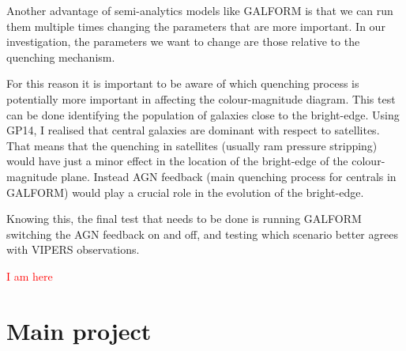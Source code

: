 \documentclass[11pt]{article}
\begin{document}
Another advantage of semi-analytics models like GALFORM is that we can run them multiple times changing the parameters that are more important. In our investigation, the parameters we want to change are those relative to the quenching mechanism.

For this reason it is important to be aware of which quenching process is potentially more important in affecting the colour-magnitude diagram. This test can be done identifying the population of galaxies close to the bright-edge.
 Using GP14, I realised that central galaxies are dominant with respect to satellites. That means that the quenching in satellites (usually ram pressure stripping) would have just a minor effect in the location of the bright-edge of the colour-magnitude plane. Instead AGN feedback (main quenching process for centrals in GALFORM) would play a crucial role in the evolution of the bright-edge. 

Knowing this, the final test that needs to be done is running GALFORM switching the AGN feedback on and off, and testing which scenario better agrees with VIPERS observations.



\textcolor{red}{I am here}
\section{Main project}
\label{sec:main}
\end{document}
